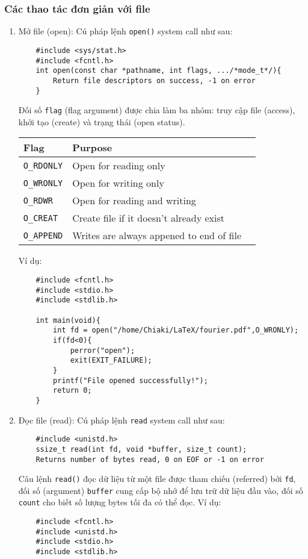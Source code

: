 \documentclass{article}
\begin{document}
\subsubsection{Các thao tác đơn giản với file}
\begin{enumerate}
    \item Mở file (open):
    Cú pháp lệnh \verb|open()| system call như sau:
\begin{verbatim}
    #include <sys/stat.h>
    #include <fcntl.h>
    int open(const char *pathname, int flags, .../*mode_t*/){
        Return file descriptors on success, -1 on error
    }
\end{verbatim}
Đối số \verb|flag| (flag argument) được chia làm ba nhóm: truy cập file (access),  khởi tạo (create) và trạng thái (open status).
\begin{center}
    \begin{tabular}{ |l|l|l| } 
    \hline
    Flag & Purpose \\ 
    \hline
    \verb|O_RDONLY| & Open for reading only \\ 
    \hline
    \verb|O_WRONLY| & Open for writing only \\
    \hline
    \verb|O_RDWR| & Open for reading and writing \\
    \hline
    \verb|O_CREAT| & Create file if it doesn't already exist \\
    \hline
    \verb|O_APPEND| & Writes are always appened to end of file \\
    \hline
    \end{tabular}
    \end{center}
    Ví dụ:
    \begin{verbatim}
    #include <fcntl.h>
    #include <stdio.h>
    #include <stdlib.h>
        
    int main(void){
        int fd = open("/home/Chiaki/LaTeX/fourier.pdf",O_WRONLY);
        if(fd<0){
            perror("open");
            exit(EXIT_FAILURE);
        }
        printf("File opened successfully!");
        return 0;
    }
    \end{verbatim}
    \item Đọc file (read): Cú pháp lệnh \verb|read| system call như sau:
    \begin{verbatim}
    #include <unistd.h>
    ssize_t read(int fd, void *buffer, size_t count);
    Returns number of bytes read, 0 on EOF or -1 on error
    \end{verbatim}
    Câu lệnh \verb|read()| đọc dữ liệu từ một file được tham chiếu (referred) bởi \verb|fd|, đối số (argument) \verb|buffer| cung cấp bộ nhớ để lưu trữ dữ liệu đầu vào, đối số \verb|count| cho biết số lượng bytes tối đa có thể đọc.
Ví dụ:
\begin{verbatim}
    #include <fcntl.h>
    #include <unistd.h>
    #include <stdio.h>
    #include <stdlib.h>
    

\end{verbatim}
\end{enumerate}
\end{document}
